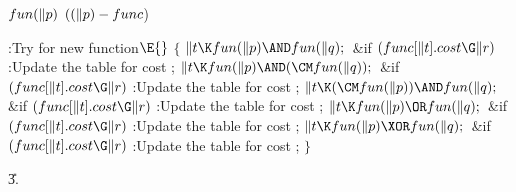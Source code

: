\B\D$\\{fun}(\|p)$ \5
$((\|p)-\\{func}{}$)\par
\Y\B\4:Try for new function\X${}\E{}$\6
${}\{{}$\1\6
${}\|t\K\\{fun}(\|p)\AND\\{fun}(\|q);{}$\6
\&{if} ${}(\\{func}[\|t].\\{cost}\G\|r){}$\1\5
:Update the table for cost \X;\2\6
${}\|t\K\\{fun}(\|p)\AND(\CM\\{fun}(\|q));{}$\6
\&{if} ${}(\\{func}[\|t].\\{cost}\G\|r){}$\1\5
:Update the table for cost \X;\2\6
${}\|t\K(\CM\\{fun}(\|p))\AND\\{fun}(\|q);{}$\6
\&{if} ${}(\\{func}[\|t].\\{cost}\G\|r){}$\1\5
:Update the table for cost \X;\2\6
${}\|t\K\\{fun}(\|p)\OR\\{fun}(\|q);{}$\6
\&{if} ${}(\\{func}[\|t].\\{cost}\G\|r){}$\1\5
:Update the table for cost \X;\2\6
${}\|t\K\\{fun}(\|p)\XOR\\{fun}(\|q);{}$\6
\&{if} ${}(\\{func}[\|t].\\{cost}\G\|r){}$\1\5
:Update the table for cost \X;\2\6
\4${}\}{}$\2\par
\U3.\fi

